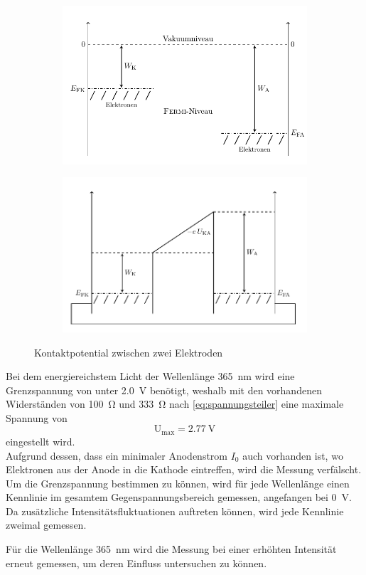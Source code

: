 \begin{figure}[htb]
	\centering
	\begin{subfigure}[c]{0.46\linewidth}
		\includegraphics[width=\linewidth]{../figs/fermi1.png}
	\end{subfigure}
	\begin{subfigure}[c]{0.46\linewidth}
		\includegraphics[width=\linewidth]{../figs/fermi2.png}
	\end{subfigure}
	\caption{Kontaktpotential zwischen zwei Elektroden}
\end{figure}

Bei dem energiereichstem Licht der Wellenlänge \SI{365}{\nano\meter} wird eine Grenzspannung von unter
\SI{2.0}{\volt} benötigt, weshalb mit den vorhandenen Widerständen von \SI{100}{\ohm} und \SI{333}{\ohm}
nach \cref{eq:spannungsteiler} eine maximale Spannung von
\[\mathrm U_\mathrm{max} = \SI{2.77}{\volt}\]
eingestellt wird.\\
Aufgrund dessen, dass ein minimaler Anodenstrom $I_0$ auch vorhanden ist, wo Elektronen aus der
Anode in die Kathode eintreffen, wird die Messung verfälscht. Um die Grenzspannung bestimmen zu können,
wird für jede Wellenlänge einen Kennlinie im gesamtem Gegenspannungsbereich gemessen, angefangen
bei \SI{0}{\volt}. Da zusätzliche Intensitätsfluktuationen auftreten können, wird jede Kennlinie
zweimal gemessen.\\\par
Für die Wellenlänge \SI{365}{\nano\meter} wird die Messung bei einer erhöhten Intensität
erneut gemessen, um deren Einfluss untersuchen zu können.

